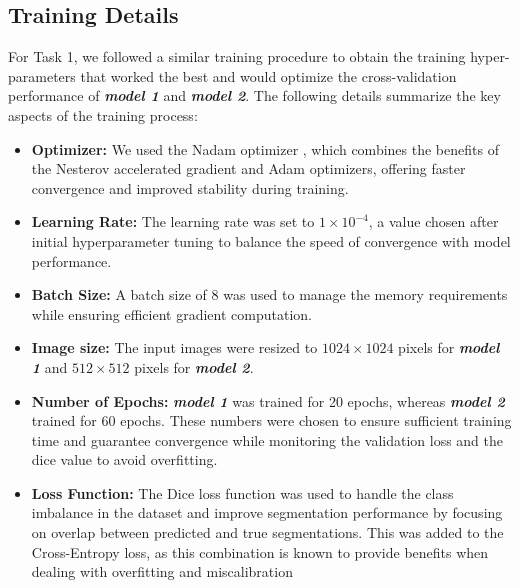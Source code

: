 \subsection{Training  Details}

For Task 1, we followed a similar training procedure to obtain the training hyper-parameters that worked the best and would optimize the cross-validation performance of \textbf{\textit{model 1}} and \textit{\textbf{model 2}}. The following details summarize the key aspects of the training process:

\begin{itemize}
\item \textbf{Optimizer:} We used the Nadam optimizer \cite{dozat2016}, which combines the benefits of the Nesterov accelerated gradient and Adam optimizers, offering faster convergence and improved stability during training.
    
\item \textbf{Learning Rate:} The learning rate was set to \(1 \times 10^{-4}\), a value chosen after initial hyperparameter tuning to balance the speed of convergence with model performance.
    
\item \textbf{Batch Size:} A batch size of 8 was used to manage the memory requirements while ensuring efficient gradient computation.
    
\item \textbf{Image size:} The input images were resized to \(1024 \times 1024\) pixels for \textbf{\textit{model 1}} and \(512 \times 512\) pixels for \textbf{\textit{model 2}}.
    
\item \textbf{Number of Epochs:} \textbf{\textit{model 1}} was trained for 20 epochs, whereas \textbf{\textit{model 2}} trained for 60 epochs. 
These numbers were chosen to ensure sufficient training time and guarantee convergence while monitoring the validation loss and the dice value to avoid overfitting.
    
\item \textbf{Loss Function:} The Dice loss function was used to handle the class imbalance in the dataset and improve segmentation performance by focusing on overlap between predicted and true segmentations. 
This was added to the Cross-Entropy loss, as this combination is known to provide benefits when dealing with overfitting and miscalibration %
\end{itemize}

